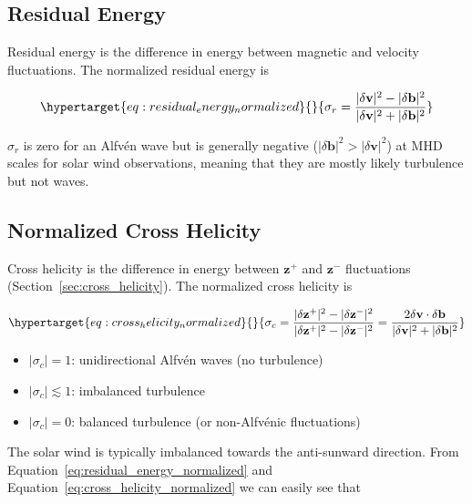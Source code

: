 \documentclass[
  notoc %
]{tufte-book}
\providecommand{\tightlist}{%
  \setlength{\itemsep}{0pt}\setlength{\parskip}{0pt}
}
\begin{document}
\hypertarget{residual-energy}{%
\subsection{Residual Energy}\label{residual-energy}}

Residual energy is the difference in energy between magnetic and
velocity fluctuations. The normalized residual energy is

\begin{equation}\protect\hypertarget{eq:residual_energy_normalized}{}{
\sigma_r = \frac{|\delta\mathbf{v}|^2 - |\delta\mathbf{b}|^2}{|\delta\mathbf{v}|^2 + |\delta\mathbf{b}|^2}
}\label{eq:residual_energy_normalized}\end{equation}

\(\sigma_r\) is zero for an Alfvén wave but is generally negative
(\(|\delta\mathbf{b}|^2 > |\delta\mathbf{v}|^2\)) at MHD scales for
solar wind observations, meaning that they are mostly likely turbulence
but not waves.

\hypertarget{sec:turbulence_cross_helicity}{%
\subsection{Normalized Cross
Helicity}\label{sec:turbulence_cross_helicity}}

Cross helicity is the difference in energy between \(\mathbf{z}^+\) and
\(\mathbf{z}^-\) fluctuations (Section~\ref{sec:cross_helicity}). The
normalized cross helicity is

\begin{equation}\protect\hypertarget{eq:cross_helicity_normalized}{}{
\sigma_c = \frac{|\delta\mathbf{z}^+|^2 - |\delta\mathbf{z}^-|^2}{|\delta\mathbf{z}^+|^2 - |\delta\mathbf{z}^-|^2} = \frac{2\delta\mathbf{v}\cdot\delta\mathbf{b}}{|\delta\mathbf{v}|^2 + |\delta\mathbf{b}|^2}
}\label{eq:cross_helicity_normalized}\end{equation}

\begin{itemize}
\tightlist
\item
  \(|\sigma_c|=1\): unidirectional Alfvén waves (no turbulence)
\item
  \(|\sigma_c|\lesssim 1\): imbalanced turbulence
\item
  \(|\sigma_c|=0\): balanced turbulence (or non-Alfvénic fluctuations)
\end{itemize}

The solar wind is typically imbalanced towards the anti-sunward
direction. From Equation~\ref{eq:residual_energy_normalized} and
Equation~\ref{eq:cross_helicity_normalized} we can easily see that
\end{document}
